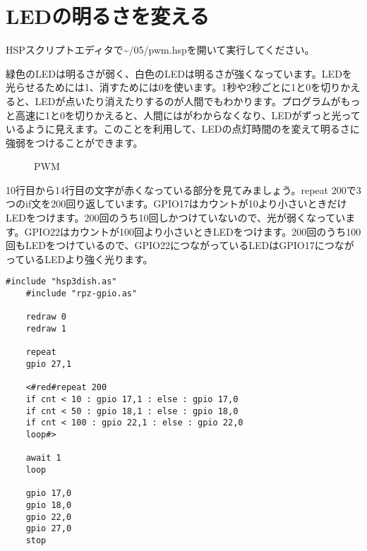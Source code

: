 \section{LEDの明るさを変える}
HSPスクリプトエディタで\textasciitilde /05/pwm.hspを開いて実行してください。

緑色のLEDは明るさが弱く、白色のLEDは明るさが強くなっています。LEDを光らせるためには1、消すためには0を使います。1秒や2秒ごとに1と0を切りかえると、LEDが点いたり消えたりするのが人間でもわかります。プログラムがもっと高速に1と0を切りかえると、人間にはがわからなくなり、LEDがずっと光っているように見えます。このことを利用して、LEDの点灯時間のを変えて明るさに強弱をつけることができます。

\begin{figure}[H]
\centering

\caption{PWM}
\end{figure}

10行目から14行目の文字が赤くなっている部分を見てみましょう。repeat 200で3つのif文を200回り返しています。GPIO17はカウントが10より小さいときだけLEDをつけます。200回のうち10回しかつけていないので、光が弱くなっています。GPIO22はカウントが100回より小さいときLEDをつけます。200回のうち100回もLEDをつけているので、GPIO22につながっているLEDはGPIO17につながっているLEDより強く光ります。

\begin{lstlisting}[caption=pwm.hsp,label=pwm.hsp]
    #include "hsp3dish.as"
    #include "rpz-gpio.as"
    
    redraw 0
    redraw 1
    
    repeat
    gpio 27,1
    
    <#red#repeat 200
    if cnt < 10 : gpio 17,1 : else : gpio 17,0
    if cnt < 50 : gpio 18,1 : else : gpio 18,0
    if cnt < 100 : gpio 22,1 : else : gpio 22,0
    loop#>
    
    await 1
    loop
    
    gpio 17,0
    gpio 18,0
    gpio 22,0
    gpio 27,0
    stop
    
    \end{lstlisting}
    